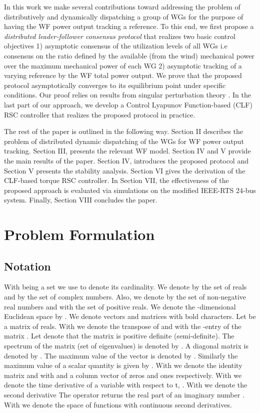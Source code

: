 \documentclass[letterpaper, 10 pt, conference]{ieeeconf}
\begin{document}
\par In this work we make several contributions toward addressing the problem of distributively and dynamically dispatching a group of WGs for the purpose of having the WF power output tracking a reference. To this end, we first propose a \textit{distributed leader-follower consensus protocol} that realizes two basic control objectives 1) asymptotic consensus of the utilization levels of all WGs i.e consensus on the ratio defined by the available (from the wind) mechanical power over the maximum mechanical power of each WG 2)  asymptotic tracking of a varying reference by the         WF total power output. We prove that the proposed protocol asymptotically converges to its equilibrium point under specific conditions. Our proof relies on results from singular  perturbation theory \cite{khalil}. In the last part of our approach, we develop a Control Lyapunov Function-based (CLF) \cite{sontag}  RSC controller that realizes the proposed protocol in practice.
\par The rest of the paper is outlined in the following way. Section II describes the problem of distributed dynamic dispatching of the WGs for WF power output tracking. Section III, presents the relevant WF model. Section IV and V provide the main results of the paper. Section IV, introduces the proposed protocol and Section V presents the stability analysis.  Section VI gives the derivation of  the CLF-based torque RSC controller. In Section VII, the effectiveness of the proposed approach is evaluated via  simulations on the modified IEEE-RTS 24-bus system. Finally, Section VIII concludes the paper.


\section{Problem Formulation}
\subsection{Notation}

With  being a set we use  to denote its cardinality. We denote by   the set of reals and by  the set of complex numbers. Also, we denote by  the set of non-negative real numbers and with  the set of positive reals. We denote the -dimensional Euclidean space  by . We denote vectors and matrices with bold characters. Let  be a  matrix of reals. With  we denote the transpose of  and with  the -entry of the matrix . Let  denote that the matrix   is positive definite (semi-definite). The spectrum  of the matrix  (set of eigenvalues) is denoted by . A  diagonal matrix  is denoted by .  The maximum value of the vector  is denoted by . 
  Similarly the maximum value of a scalar quantity  is given by .  With  we denote the  identity matrix and with  and  a  column vector of zeros and ones respectively.
 With  we denote the time derivative of a variable  with respect to t, .  With  we denote the second derivative  The operator  returns the real part of an imaginary number . With  we denote the space of functions with continuous second derivatives.
\end{document}
